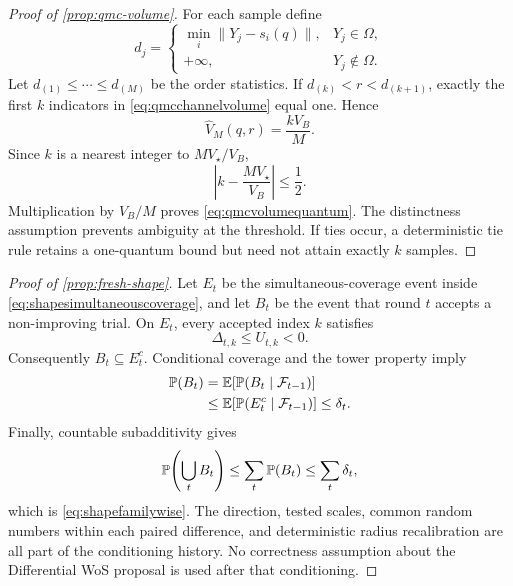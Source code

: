 \begin{proof}[Proof of \cref{prop:qmc-volume}]
For each sample define
\begin{equation}
 d_j=\begin{cases}
 \min_i\|Y_j-s_i(q)\|,&Y_j\in\Omega,\\
 +\infty,&Y_j\notin\Omega.
 \end{cases}
\end{equation}
Let $d_{(1)}\le\cdots\le d_{(M)}$ be the order statistics.  If
$d_{(k)}<r<d_{(k+1)}$, exactly the first $k$ indicators in
\cref{eq:qmcchannelvolume} equal one.  Hence
\begin{equation}
 \widehat V_M(q,r)=\frac{kV_B}{M}.
\end{equation}
Since $k$ is a nearest integer to $MV_\star/V_B$,
\begin{equation}
 \left|k-\frac{MV_\star}{V_B}\right|\le\frac12.
\end{equation}
Multiplication by $V_B/M$ proves \cref{eq:qmcvolumequantum}.  The distinctness
assumption prevents ambiguity at the threshold.  If ties occur, a deterministic
tie rule retains a one-quantum bound but need not attain exactly $k$ samples.
\end{proof}

\begin{proof}[Proof of \cref{prop:fresh-shape}]
Let $E_t$ be the simultaneous-coverage event inside
\cref{eq:shapesimultaneouscoverage}, and let $B_t$ be the event that round $t$
accepts a non-improving trial.  On $E_t$, every accepted index $k$ satisfies
\begin{equation}
 \Delta_{t,k}\le U_{t,k}<0.
\end{equation}
Consequently $B_t\subseteq E_t^c$.  Conditional coverage and the tower
property imply
\begin{align}
 \mathbb{P}(B_t)
 &=\mathbb{E}[\mathbb{P}(B_t\mid\mathcal F_{t-1})]\\
 &\le\mathbb{E}[\mathbb{P}(E_t^c\mid\mathcal F_{t-1})]
 \le\delta_t.
\end{align}
Finally, countable subadditivity gives
\begin{equation}
 \mathbb{P}\!\left(\bigcup_tB_t\right)
 \le\sum_t\mathbb{P}(B_t)\le\sum_t\delta_t,
\end{equation}
which is \cref{eq:shapefamilywise}.  The direction, tested scales, common
random numbers within each paired difference, and deterministic radius
recalibration are all part of the conditioning history.  No correctness
assumption about the Differential WoS proposal is used after that conditioning.
\end{proof}

